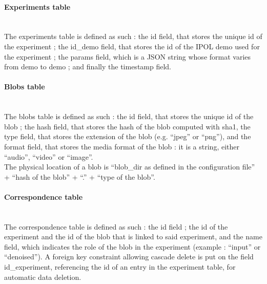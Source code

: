 \paragraph{Experiments table} \hspace{0pt} \\
The experiments table is defined as such : the id field, that stores the unique id of the experiment ; the id\_demo field, that stores the id of the IPOL demo used for the experiment ; the params field, which is a JSON string whose format varies from demo to demo ; and finally the timestamp field.

\paragraph{Blobs table} \hspace{0pt} \\
The blobs table is defined as such : the id field, that stores the unique id of the blob ; the hash field, that stores the hash of the blob computed with sha1, the type field, that stores the extension of the blob (e.g. ``jpeg'' or ``png''), and the format field, that stores the media format of the blob : it is a string, either ``audio'', ``video'' or ``image''. \\
The physical location of a blob is ``blob\_dir as defined in the configuration file'' + ``hash of the blob'' + ``.'' + ``type of the blob''.

\paragraph{Correspondence table} \hspace{0pt} \\
The correspondence table is defined as such : the id field ; the id of the experiment and the id of the blob that is linked to said experiment, and the name field, which indicates the role of the blob in the experiment (example : ``input'' or ``denoised''). A foreign key constraint allowing cascade delete is put on the field id\_experiment, referencing the id of an entry in the experiment table, for automatic data deletion.


